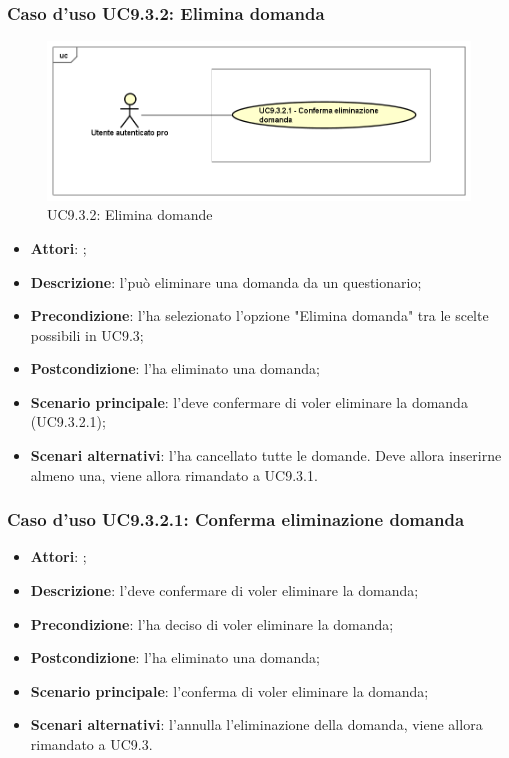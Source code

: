 		 \subsubsection{Caso d'uso UC9.3.2: Elimina domanda}
		 \label{UC9.3.2}
		 \begin{figure}[h]
		 	\centering
		 	\includegraphics[scale=0.5,keepaspectratio]{UML/UC9_3_2.png}
		 	\caption{UC9.3.2: Elimina domande}
		 \end{figure}
		 \FloatBarrier
		 \begin{itemize}
		 	\item \textbf{Attori}: \uaupro;
		 	\item \textbf{Descrizione}: l'\uaupro può eliminare una domanda da un questionario;
		 	\item \textbf{Precondizione}: l'\uaupro ha selezionato l'opzione "Elimina domanda" tra le scelte possibili in UC9.3;
		 	\item \textbf{Postcondizione}: l'\uaupro ha eliminato una domanda;
		 	\item \textbf{Scenario principale}: l'\uaupro deve confermare di voler eliminare la domanda (UC9.3.2.1); 
		 	\item \textbf{Scenari alternativi}: l'\uaupro ha cancellato tutte le domande. Deve allora inserirne almeno una, viene allora rimandato a UC9.3.1.
		 \end{itemize}
		 
		 \subsubsection{Caso d'uso UC9.3.2.1: Conferma eliminazione domanda}
		 \label{UC9.3.2.1}
		 \begin{itemize}
		 	\item \textbf{Attori}: \uaupro;
		 	\item \textbf{Descrizione}: l'\uaupro deve confermare di voler eliminare la domanda;
		 	\item \textbf{Precondizione}: l'\uaupro ha deciso di voler eliminare la domanda;
		 	\item \textbf{Postcondizione}: l'\uaupro ha eliminato una domanda;
		 	\item \textbf{Scenario principale}: l'\uaupro conferma di voler eliminare la domanda;
		 	\item \textbf{Scenari alternativi}: l'\uaupro annulla l'eliminazione della domanda, viene allora rimandato a UC9.3.
		 \end{itemize}
		 

